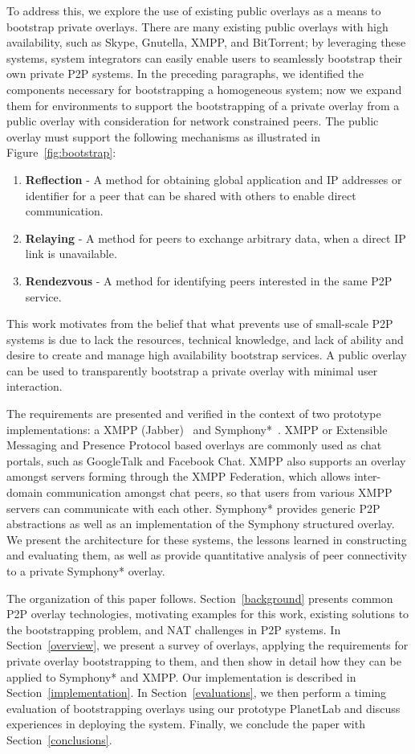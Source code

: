 \documentclass[conference]{IEEEtran}
\begin{document}
To address this, we explore the use of existing public overlays as a means to
bootstrap private overlays.  There are many existing public
overlays with high availability, such as Skype, Gnutella, XMPP, and BitTorrent;
by leveraging these systems, system integrators can easily enable users to
seamlessly bootstrap their own private P2P systems.  In the preceding
paragraphs, we identified the components necessary for bootstrapping a
homogeneous system; now we expand them for environments to support the
bootstrapping of a private overlay from a public overlay with consideration for
network constrained peers.  The public overlay must support the following
mechanisms as illustrated in Figure~\ref{fig:bootstrap}:
\begin{enumerate}
\item \textbf{Reflection} - A method for obtaining global application and
IP addresses or identifier for a peer that can be shared with others to enable
direct communication.
\item \textbf{Relaying} - A method for peers to exchange arbitrary data, when
a direct IP link is unavailable.
\item \textbf{Rendezvous} - A method for identifying peers interested in the
same P2P service.
\end{enumerate}
This work motivates from the belief that what prevents use of small-scale P2P
systems is due to lack the resources, technical knowledge, and lack of ability
and desire to create and manage high availability bootstrap services.  A public
overlay can be used to transparently bootstrap a private overlay with minimal
user interaction.

The requirements are presented and verified in the context of two prototype
implementations: a XMPP (Jabber)~\cite{xmpp} and Symphony*~\cite{brunet}.  XMPP or
Extensible Messaging and Presence Protocol based overlays are commonly used as
chat portals, such as GoogleTalk and Facebook Chat.  XMPP also supports an
overlay amongst servers forming through the XMPP Federation, which allows
inter-domain communication amongst chat peers, so that users from various XMPP
servers can communicate with each other.  Symphony* provides generic P2P
abstractions as well as an implementation of the Symphony structured overlay.
We present the architecture for these systems, the lessons learned in
constructing and evaluating them,  as well as provide quantitative analysis of
peer connectivity to a private Symphony* overlay.

The organization of this paper follows.  Section~\ref{background} presents
common P2P overlay technologies, motivating examples for this work, existing
solutions to the bootstrapping problem, and NAT challenges in P2P systems.  In
Section~\ref{overview}, we present a survey of overlays, applying the
requirements for private overlay bootstrapping to them, and then show in detail
how they can be applied to Symphony* and XMPP.  Our implementation is described in
Section~\ref{implementation}.  In Section~\ref{evaluations}, we then perform a
timing evaluation of bootstrapping overlays using our prototype PlanetLab and
discuss experiences in deploying the system.  Finally, we conclude the paper
with Section~\ref{conclusions}.
\end{document}

